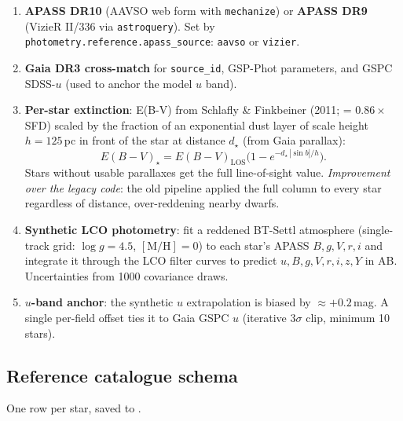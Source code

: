\documentclass[12pt,a4paper]{article}
\begin{document}
\begin{enumerate}
  \item \textbf{APASS DR10} (AAVSO web form with \texttt{mechanize}) or
        \textbf{APASS DR9} (VizieR II/336 via \texttt{astroquery}).  Set by
        \texttt{photometry.reference.apass\_\hspace{0pt}source}: \texttt{aavso} or
        \texttt{vizier}.
  \item \textbf{Gaia DR3 cross-match} for \texttt{source\_id}, GSP-Phot
        parameters, and GSPC SDSS-$u$ (used to anchor the model $u$ band).
  \item \textbf{Per-star extinction}: E(B-V) from Schlafly \& Finkbeiner
        (2011; = $0.86\times$SFD) scaled by the fraction of an exponential
        dust layer of scale height $h = 125$\,pc in front of the star at
        distance $d_\star$ (from Gaia parallax):
        \begin{equation}
          E(B-V)_\star = E(B-V)_\mathrm{LOS}
          \bigl(1 - e^{-d_\star\,|\sin b| / h}\bigr).
        \end{equation}
        Stars without usable parallaxes get the full line-of-sight value.
        \emph{Improvement over the legacy code}: the old pipeline applied the
        full column to every star regardless of distance, over-reddening
        nearby dwarfs.
  \item \textbf{Synthetic LCO photometry}: fit a reddened BT-Settl atmosphere
        (single-track grid: $\log g = 4.5$, $[\mathrm{M/H}] = 0$) to each
        star's APASS $B,g,V,r,i$ and integrate it through the LCO filter
        curves to predict $u,B,g,V,r,i,z,Y$ in AB.  Uncertainties from
        1000 covariance draws.
  \item \textbf{$u$-band anchor}: the synthetic $u$ extrapolation is biased
        by $\approx +0.2$\,mag.  A single per-field offset ties it to Gaia
        GSPC $u$ (iterative $3\sigma$ clip, minimum 10 stars).
\end{enumerate}

\subsection{Reference catalogue schema}

One row per star, saved to .
\end{document}
